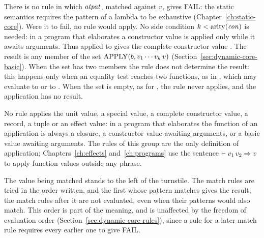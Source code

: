 \begin{rulecomments}
 There is no rule in which $\mathit{atpat}$, matched
against $v$, gives FAIL: the static semantics requires the pattern of a
lambda to be exhaustive (Chapter~\ref{ch:static-core}). Were it to fail, no
rule would apply.
 No side condition $k<\mathrm{arity}(\mathit{con})$ is needed: in a
program that elaborates a constructor value is applied only while it awaits
arguments. Thus  applied to  gives the complete constructor
value .
 The result is any member of the set
$\mathrm{APPLY}(b,v_1\cdots v_k\,v)$
(Section~\ref{sec:dynamic-core-basic}). When the set has two members the rule
does not determine the result: this happens only when an equality test
reaches two functions, as in , which may evaluate to  or to . When the set is
empty, as for , the rule never applies, and the application
has no result. %
\end{rulecomments}

No rule applies the unit value, a special value, a complete constructor
value, a record, a tuple or an effect value: in a program that elaborates the
function of an application is always a closure, a constructor value awaiting
arguments, or a basic value awaiting arguments. The rules of this group are
the only definition of application; Chapters~\ref{ch:effects}
and~\ref{ch:programs} use the sentence $\vdash v_1\,v_2 \Rightarrow v$ to apply function
values outside any phrase.


  {}

  {}

  {}

\begin{rulecomments}
 The value being matched stands to the left of
the turnstile. The match rules are tried in the
order written, and the first whose pattern matches gives the result; the
match rules after it are not evaluated, even when their patterns would also
match. This order is part of the meaning, and is unaffected by the freedom of
evaluation order (Section~\ref{sec:dynamic-core-rules}), since a rule for a
later match rule requires every earlier one to give FAIL.
\end{rulecomments}

